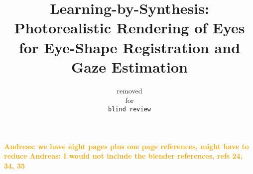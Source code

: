 \documentclass[10pt,twocolumn,letterpaper]{article}
\newcommand{\commentA}[1]{\textsf{\textbf{\textcolor{orange}{Andreas: #1}}}}
\begin{document}
\title{Learning-by-Synthesis: Photorealistic Rendering of Eyes \\ for Eye-Shape Registration and Gaze Estimation}



\author{removed\\
for\\
{\tt\small blind review}
}

\maketitle

\begin{abstract}

\end{abstract}









\commentA{we have eight pages plus one page references, might have to reduce}
\commentA{I would not include the blender references, refs 24, 34, 35}

\clearpage

{\small


}
\end{document}
